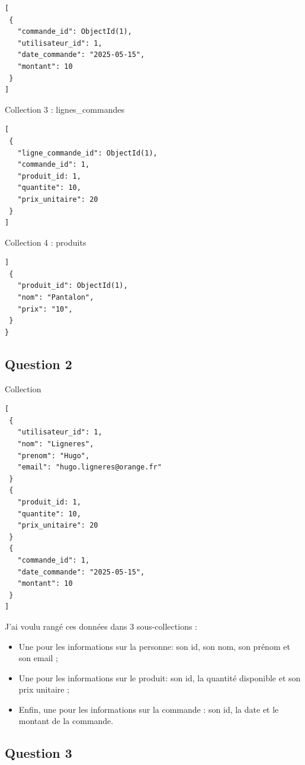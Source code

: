 \documentclass[12pt,a4paper]{article}
\begin{document}
\begin{lstlisting}
[ 
 {
   "commande_id": ObjectId(1),
   "utilisateur_id": 1,
   "date_commande": "2025-05-15",
   "montant": 10
 }
]
\end{lstlisting}

Collection 3 : lignes\_commandes \\

\begin{lstlisting}
[
 { 
   "ligne_commande_id": ObjectId(1),
   "commande_id": 1,
   "produit_id: 1,
   "quantite": 10,
   "prix_unitaire": 20
 }
]
\end{lstlisting}

Collection 4 : produits \\

\begin{lstlisting}
]
 {
   "produit_id": ObjectId(1),
   "nom": "Pantalon",
   "prix": "10",
 }
}
\end{lstlisting}

	\subsection*{Question 2}

Collection

\begin{lstlisting}
[
 {
   "utilisateur_id": 1,
   "nom": "Ligneres",
   "prenom": "Hugo",
   "email": "hugo.ligneres@orange.fr"
 }
 {
   "produit_id: 1,
   "quantite": 10,
   "prix_unitaire": 20
 }
 {
   "commande_id": 1,
   "date_commande": "2025-05-15",
   "montant": 10
 }
]
\end{lstlisting}
\newpage

J'ai voulu rangé ces données dans 3 sous-collections : \\

\begin{itemize}
	\item Une pour les informations sur la personne: son id, son nom, son prénom et son email ;
	\item Une pour les informations sur le produit: son id, la quantité disponible et son prix unitaire ;
	\item Enfin, une pour les informations sur la commande : son id, la date et le montant de la commande.
\end{itemize}


	\subsection*{Question 3}
	
\end{document}
